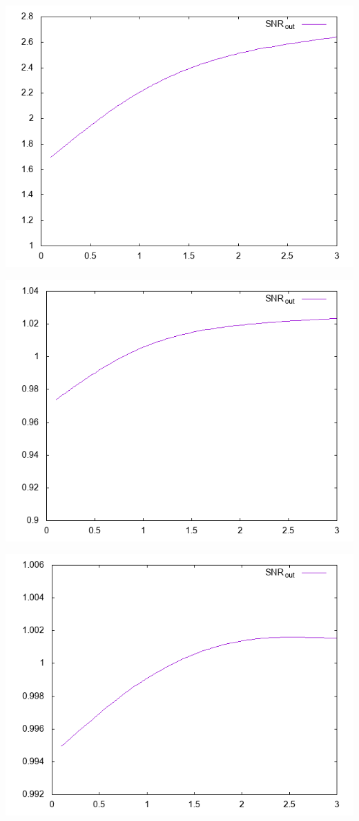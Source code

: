 \vspace*{100bp}


\includegraphics[scale=0.7,natwidth=320bp,natheight=240bp]{img/output_r4m10.csv.png}

\includegraphics[scale=0.7,natwidth=320bp,natheight=240bp]{img/output_r4m25.csv.png}

\includegraphics[scale=0.7,natwidth=320bp,natheight=240bp]{img/output_r4m50.csv.png}

